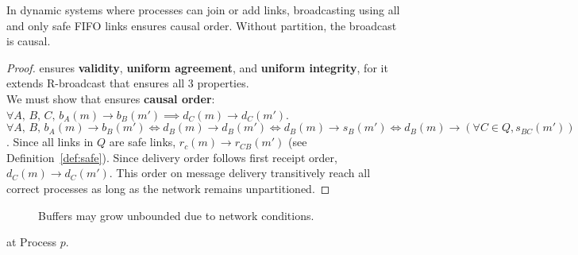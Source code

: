 \begin{lemma}
  In dynamic systems where processes can join or add links, broadcasting using
  all and only safe FIFO links ensures causal order. Without partition, the
  broadcast is causal.
\end{lemma}

\begin{proof}
  \CBROADCAST ensures \textbf{validity}, \textbf{uniform agreement}, and
  \textbf{uniform integrity},
  for it extends R-broadcast that ensures all 3 properties. \\
  We must show that \CBROADCAST ensures \textbf{causal order}:
  $\forall A,\,B,\,C,\, b_A(m) \rightarrow b_B(m')
  \implies d_C(m) \rightarrow d_C(m')$. \\
  $\forall A,\,B,\, b_A(m) \rightarrow b_B(m') \Leftrightarrow d_B(m)
  \rightarrow d_B(m') \Leftrightarrow d_B(m) \rightarrow s_B(m') \Leftrightarrow
  d_B(m) \rightarrow (\forall C\in Q, s_{BC}(m'))$.
  Since all links in $Q$ are safe links, $r_c(m) \rightarrow r_{CB}(m')$ (see
  Definition~\ref{def:safe}).  Since delivery order follows first receipt order,
  $d_C(m) \rightarrow d_C(m')$. This order on message delivery transitively
  reach all correct processes as long as the network remains unpartitioned.
\end{proof}



\begin{figure*}
  \begin{center}
    \hspace{20pt}
    \hspace{20pt}
    \caption{\label{fig:bufferproblem}Buffers may grow unbounded due to network
      conditions.}
  \end{center}
\end{figure*}



\begin{algorithm}
  
  \caption{\label{algo:bufferbroadcast}\CBROADCAST at Process $p$.}
\end{algorithm}


